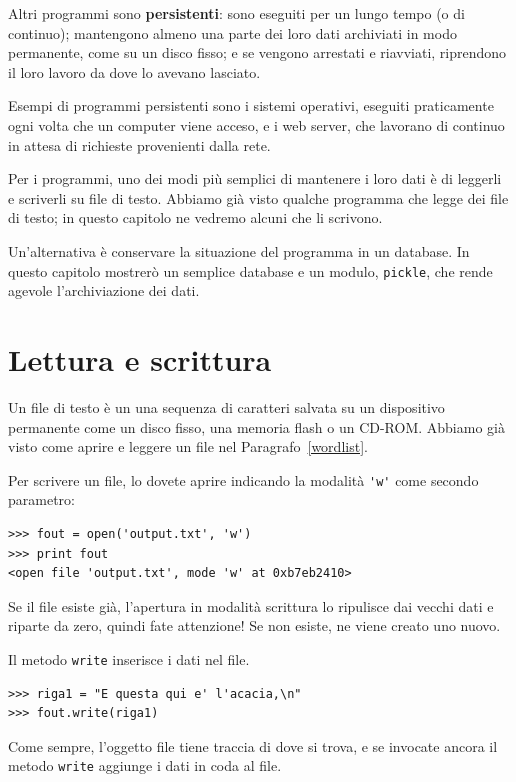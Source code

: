 \documentclass[10pt]{book}
\begin{document}
Altri programmi sono {\bf persistenti}: sono eseguiti per un lungo tempo (o di continuo); mantengono almeno una parte dei loro dati archiviati in modo permanente, come su un disco fisso; e se vengono arrestati e riavviati, riprendono il loro lavoro da dove lo avevano lasciato.

Esempi di programmi persistenti sono i sistemi operativi, eseguiti praticamente ogni volta che un computer viene acceso, e i web server, che lavorano di continuo in attesa di richieste provenienti dalla rete.

Per i programmi, uno dei modi più semplici di mantenere i loro dati è di leggerli e scriverli su file di testo. Abbiamo già visto qualche programma che legge dei file di testo; in questo capitolo ne vedremo alcuni che li scrivono.

Un'alternativa è conservare la situazione del programma in un database. In questo capitolo mostrerò un semplice database e un modulo, {\tt pickle}, che rende agevole l'archiviazione dei dati.


\section{Lettura e scrittura}

Un file di testo è un una sequenza di caratteri salvata su un dispositivo permanente come un disco fisso, una memoria flash o un CD-ROM. Abbiamo già visto come aprire e leggere un file nel Paragrafo~\ref{wordlist}.

Per scrivere un file, lo dovete aprire indicando la modalità \verb"'w'" come secondo parametro:

\begin{verbatim}
>>> fout = open('output.txt', 'w')
>>> print fout
<open file 'output.txt', mode 'w' at 0xb7eb2410>
\end{verbatim}
%
Se il file esiste già, l'apertura in modalità scrittura lo ripulisce dai vecchi dati e riparte da zero, quindi fate attenzione! Se non esiste, ne viene creato uno nuovo.

Il metodo {\tt write} inserisce i dati nel file.

\begin{verbatim}
>>> riga1 = "E questa qui e' l'acacia,\n"
>>> fout.write(riga1)
\end{verbatim}
%
Come sempre, l'oggetto file tiene traccia di dove si trova, e se invocate ancora il metodo {\tt write} aggiunge i dati in coda al file.
\end{document}
